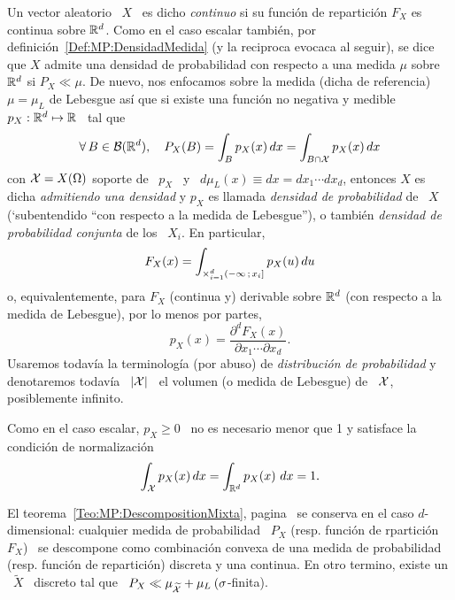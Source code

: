 \begin{definicion}
\label{Def:MP:VectorAleatorioContinuo}
%
  Un  vector aleatorio  \  $X$ \  es dicho  {\it  continuo} si  su funci\'on  de
  repartici\'on  $F_X$ es  continua sobre  $\mathbb{R}^d$.  Como  en el  caso escalar
  tambi\'en,   por  definici\'on~\ref{Def:MP:DensidadMedida}  (y   la  reciproca
  evocaca al  seguir), se dice que  $X$ admite una densidad  de probabilidad con
  respecto a  una medida $\mu$ sobre $\mathbb{R}^d$  si $P_X \ll \mu$.   De nuevo, nos
  enfocamos  sobre la medida  (dicha de  referencia) $\mu  = \mu_L$  de Lebesgue
  as\'i  que si  existe una  funci\'on  no negativa  y medible  \ $p_X:  \mathbb{R}^d
  \mapsto \mathbb{R}$ \ tal que
  \[
  \forall \,  B \in \mathcal{B}(\mathbb{R}^d),  \quad P_X(B) =  \int_B p_X(x) \, dx  = \int_{B
    \cap \mathcal{X}} p_X(x) \, dx
  \]
  con $\mathcal{X}  = X(\Omega)$ soporte  de \ $p_X$  \ y \  $d\mu_L(x) \equiv dx  = dx_1
  \cdots dx_d$, entonces  $X$ es dicha {\it admitiendo una  densidad} y $p_X$ es
  llamada {\it densidad de probabilidad} de \ $X$ (`subentendido ``con respecto a
  la medida de Lebesgue''), o  tambi\'en {\it densidad de probabilidad conjunta}
  de los \ $X_i$. En particular,
  \[
  F_X(x) =  \int_{\operatorname*{\times}_{i=1}^d (-\infty \, ;  \, x_i]} p_X(u) \, du
  \]
  o, equivalentemente,  para $F_X$ (continua  y) derivable sobre  $\mathbb{R}^d$ (con
  respecto a la medida de Lebesgue), por lo menos por partes,
  \[
  p_X(x) = \frac{\partial^d F_X(x)}{\partial x_1 \cdots \partial x_d}.
  \]
  Usaremos  todav\'ia la terminolog\'ia  (por abuso)  de {\it  distribuci\'on de
    probabilidad} y  denotaremos todav\'ia  \ $|\mathcal{X}|$ \  el volumen (o  medida de
  Lebesgue) de \ $\mathcal{X}$, posiblemente infinito.
\end{definicion}

Como en el caso  escalar, $p_X \ge 0$ \ no es necesario  menor que 1 y satisface
la condici\'on de normalizaci\'on
%
\[
\int_{\mathcal{X}} p_X(x) \, dx = \int_{\mathbb{R}^d} p_X(x) \ dx  = 1.
\]

El                                      teorema~\ref{Teo:MP:DescompositionMixta},
pagina~\pageref{Teo:MP:DescompositionMixta}    se    conserva    en   el    caso
$d$-dimensional: cualquier  medida de probabilidad \ $P_X$  (resp.  funci\'on de
rpartici\'on \ $F_X$)  \ se descompone como combinaci\'on  convexa de una medida
de probabilidad (resp.  funci\'on de  repartici\'on) discreta y una continua. En
otro  termino,  existe un  \  $\widetilde{X}$  \ discreto  tal  que  \ $P_X  \ll
\mu_{\widetilde{\mathcal{X}}} + \mu_L \: (\sigma$-finita).

